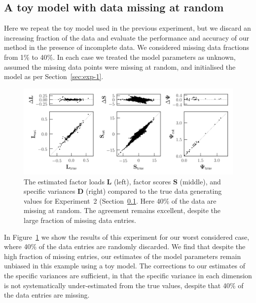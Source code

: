 \documentclass[twocolumn]{aastex62}
\newcommand{\vect}[1]{\boldsymbol{\mathbf{#1}}}
\renewcommand{\vec}[1]{\vect{#1}}
\newcommand{\factorloads}{\textbf{L}}
\newcommand{\factorscores}{\textbf{S}}
\newcommand{\specificvariance}{\vec{D}}
\begin{document}
\subsection{A toy model with data missing at random}
\label{sec:toy-model-missing-data}

Here we repeat the toy model used in the previous experiment, but we discard an increasing fraction
of the data and evaluate the performance and accuracy of our method in the presence
of incomplete data. We considered missing data fractions from 1\% to
40\%. In each case we treated the model parameters as unknown, assumed
the missing data points were missing at random, and initialised the
model as per Section~\ref{sec:exp-1}.

\begin{figure}[t!]
	\includegraphics[width=\textwidth]{experiments/exp-missing-data-not-at-random-inflated-40percent.png}
    \caption{The estimated factor loads $\factorloads$ (left), factor scores $\factorscores$ (middle),
    		 and specific variances $\specificvariance$ (right) compared to the 
		 	 true data generating values
		 	 for Experiment~2 (Section~\ref{sec:toy-model-missing-data}. Here 40\% of the data are missing at random.
			 The agreement remains excellent,
			 despite the large fraction of missing data entries.}
    \label{fig:exp1-missing-data}
\end{figure}


In Figure~\ref{fig:exp1-missing-data} we show the results of this
experiment for our worst considered case, where 40\% of the data
entries are randomly discarded. We find that despite the high fraction
of missing entries, our estimates of the model parameters remain unbiased
in this example using a toy model. The corrections to our estimates of the
specific variances are sufficient, in that the specific variance in each
dimension is not systematically under-estimated from the true values, 
despite that 40\% of the data entries are missing.
\end{document}
